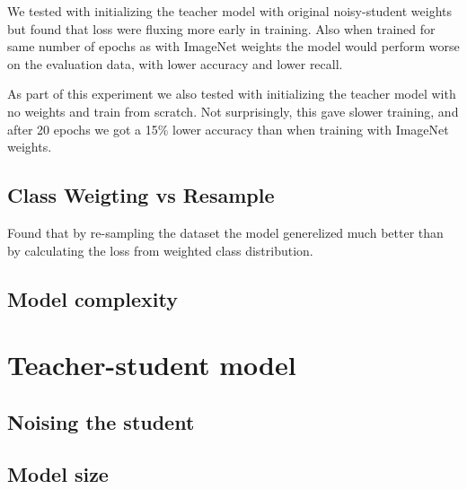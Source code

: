 \documentclass[thesis.tex]{subfiles}
\begin{document}

We tested with initializing the teacher model with original noisy-student weights but found that loss were fluxing more early in training. Also when trained for same number of epochs as with ImageNet weights the model would perform worse on the evaluation data, with lower accuracy and lower recall.


As part of this experiment we also tested with initializing the teacher model with no weights and train from scratch. Not surprisingly, this gave slower training, and after 20 epochs we got a 15\% lower accuracy than when training with ImageNet weights.



\subsection{Class Weigting vs Resample}
Found that by re-sampling the dataset the model generelized much better than by calculating the loss from weighted class distribution.




\subsection{Model complexity}






\section{Teacher-student model}



\subsection{Noising the student}



\subsection{Model size}
\end{document}
